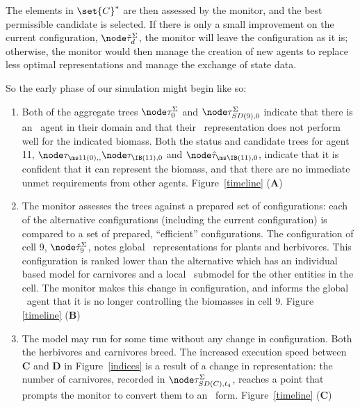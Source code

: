 The elements in $\set{C}^*$ are then assessed by the monitor, and the
best permissible candidate is selected. If there is only a small
improvement on the current con\-fig\-ur\-a\-tion, $\domt{d}$, the monitor will
leave the con\-fig\-ur\-a\-tion as it is; otherwise, the monitor would then manage
the creation of new agents to replace less optimal rep\-re\-sen\-ta\-tions and
manage the exchange of state data. 




So the early phase of our simulation might begin like so:

\begin{enumerate}
\item %
Both of the aggregate trees $\stmA{0}$ and $\stsdA{9}{0}$ indicate
that there is an \IB\ agent in their domain and that their
\SD\ rep\-re\-sen\-ta\-tion does not perform well for the indicated
biomass. Both the status and candidate trees for agent 11,
$\staR{11}{0}, \nsta{\IB}{11}{0}$ and $\asta{\IB}{11}{0}$, indicate
that it is confident that it can represent the biomass, and that there
are no immediate unmet requirements from other agents.
Figure~\ref{timeline} (\textbf{A})

\item %
The monitor assesses the trees against a prepared set of
con\-fig\-ur\-a\-tions: each of the alternative con\-fig\-ur\-a\-tions (including the
current con\-fig\-ur\-a\-tion) is compared to a set of prepared, ``efficient''
con\-fig\-ur\-a\-tions.  The con\-fig\-ur\-a\-tion of cell 9, $\domt{9}$, notes
global \SD\ rep\-re\-sen\-ta\-tions for plants and herbivores. This
con\-fig\-ur\-a\-tion is ranked lower than the alternative which has an
in\-di\-vidu\-al based model for carnivores and a local \SD\ submodel for the
other entities in the cell.   The monitor makes this change in con\-fig\-ur\-a\-tion,
and informs the global \SD\ agent that it is no longer controlling the
biomasses in cell 9. Figure
\ref{timeline} (\textbf{B})\label{firstconv}

\item\label{cv1}
The model may run for some time without any change in con\-fig\-ur\-a\-tion.
Both the herbivores and carnivores breed. The increased execution speed
between \textbf{C} and \textbf{D} in Figure~\ref{indices} is a result
of a change in representation: the number of
carnivores, recorded in $\stsdA{C}{t_4}$, reaches a point that prompts
the monitor to convert them to an \SD\ form.
Figure~\ref{timeline} (\textbf{C})


\end{enumerate}
